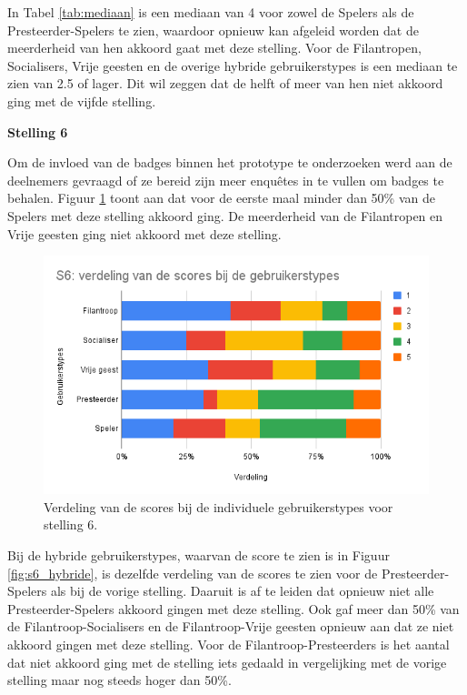 In Tabel \ref{tab:mediaan} is een mediaan van 4 voor zowel de Spelers als de Presteerder-Spelers te zien, waardoor opnieuw kan afgeleid worden dat de meerderheid van hen akkoord gaat met deze stelling. Voor de Filantropen, Socialisers, Vrije geesten en de overige hybride gebruikerstypes is een mediaan te zien van 2.5 of lager. Dit wil zeggen dat de helft of meer van hen niet akkoord ging met de vijfde stelling.

\textbf{Stelling 6}

Om de invloed van de badges binnen het prototype te onderzoeken werd aan de deelnemers gevraagd of ze bereid zijn meer enquêtes in te vullen om badges te behalen. Figuur \ref{fig:s6} toont aan dat voor de eerste maal minder dan 50\% van de Spelers met deze stelling akkoord ging. De meerderheid van de Filantropen en Vrije geesten ging niet akkoord met deze stelling.

\begin{figure}
    \includegraphics[width=\linewidth]{S6.png}
    \caption{Verdeling van de scores bij de individuele gebruikerstypes voor stelling 6.}
    \label{fig:s6}
\end{figure}

Bij de hybride gebruikerstypes, waarvan de score te zien is in Figuur \ref{fig:s6_hybride}, is dezelfde verdeling van de scores te zien voor de Presteerder-Spelers als bij de vorige stelling. Daaruit is af te leiden dat opnieuw niet alle Presteerder-Spelers akkoord gingen met deze stelling. Ook gaf meer dan 50\% van de Filantroop-Socialisers en de Filantroop-Vrije geesten opnieuw aan dat ze niet akkoord gingen met deze stelling. Voor de Filantroop-Presteerders is het aantal dat niet akkoord ging met de stelling iets gedaald in vergelijking met de vorige stelling maar nog steeds hoger dan 50\%.

